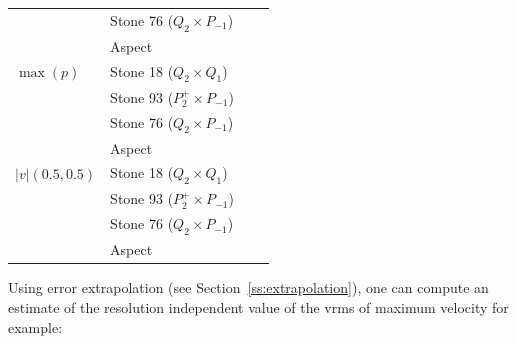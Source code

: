 \begin{center}
\begin{tabular}{llp{4cm}p{4cm}}
            & Stone 76 ($Q_2\times P_{-1}$) & & \\
            & Aspect   &          \\
\hline
$\max(p)$   & Stone 18 ($Q_2\times Q_1$) &  &    \\ 
            & Stone 93 ($P_2^+\times P_{-1}$)&  &         \\
            & Stone 76 ($Q_2\times P_{-1}$) & & \\
            & Aspect   &   &        \\
\hline
$|v|(0.5,0.5)$ & Stone 18 ($Q_2\times Q_1$) &  &    \\ 
            & Stone 93 ($P_2^+\times P_{-1}$)&  &         \\
            & Stone 76 ($Q_2\times P_{-1}$) & & \\
            & Aspect   &   &        \\
\hline
\end{tabular}
\end{center}


Using error extrapolation (see Section~\ref{ss:extrapolation}), one can compute an 
estimate of the resolution independent value of the vrms of maximum velocity for example:

